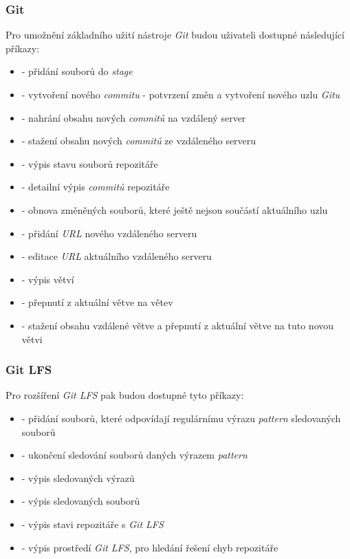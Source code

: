         \subsubsection{Git}
        Pro umožnění základního užití nástroje \emph{Git} budou uživateli dostupné následující příkazy:
        \begin{itemize}
            \item \textbf{} - přidání souborů do \emph{stage}
            \item \textbf{} - vytvoření nového \emph{commitu} - potvrzení změn a vytvoření nového uzlu \emph{Gitu}
            \item \textbf{} - nahrání obsahu nových \emph{commitů} na vzdálený server
            \item \textbf{} - stažení obsahu nových \emph{commitů} ze vzdáleného serveru
            \item \textbf{} - výpis stavu souborů repozitáře
            \item \textbf{} - detailní výpis \emph{commitů} repozitáře
            \item \textbf{} - obnova změněných souborů, které ještě nejsou součástí aktuálního uzlu
            \item \textbf{} - přidání \emph{URL} nového vzdáleného serveru
            \item \textbf{} - editace \emph{URL} aktuálního vzdáleného serveru
            \item \textbf{} - výpis větví
            \item \textbf{} - přepnutí z aktuální větve na větev 
            \item \textbf{} - stažení obsahu vzdálené větve a přepnutí z aktuální větve na tuto novou větvi
        \end{itemize}

        \subsubsection{Git LFS}
        Pro rozšíření \emph{Git LFS} pak budou dostupné tyto příkazy:
        \begin{itemize}
            \item \textbf{} - přidání souborů, které odpovídají regulárnímu výrazu \emph{pattern} sledovaných souborů
            \item \textbf{} - ukončení sledování souborů daných výrazem \emph{pattern}
            \item \textbf{} - výpis sledovaných výrazů
            \item \textbf{} - výpis sledovaných souborů 
            \item \textbf{} - výpis stavi repozitáře s \emph{Git LFS}
            \item \textbf{} - výpis prostředí \emph{Git LFS}, pro hledání řešení chyb repozitáře
        \end{itemize}
    
